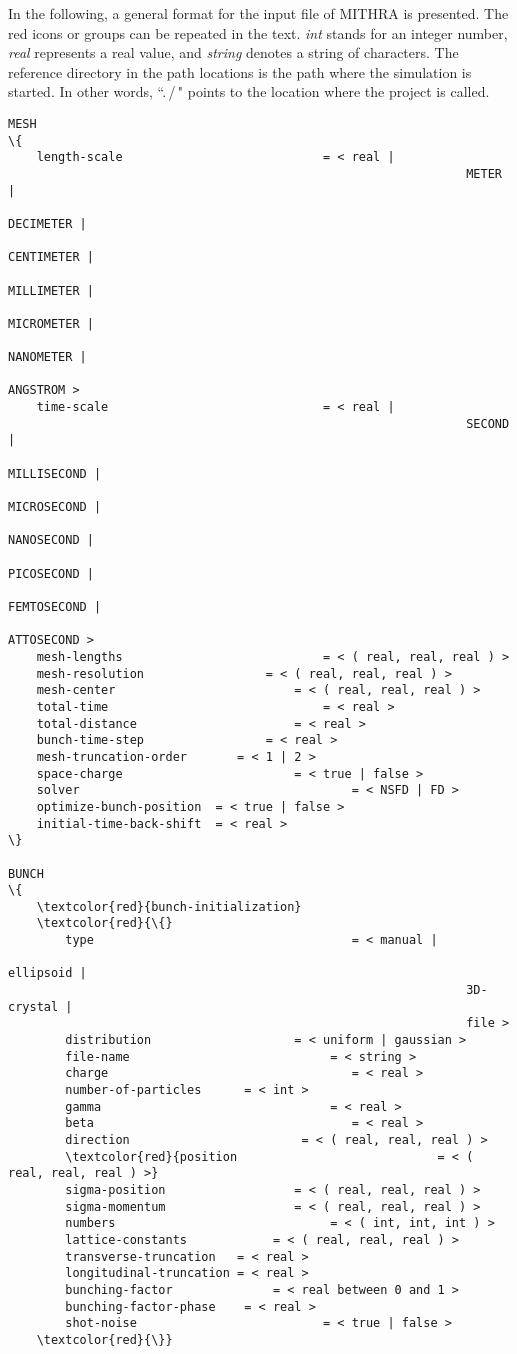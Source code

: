 \documentclass[9pt,a4paper]{article}
\begin{document}
\begin{landscape}
\begin{multicols}{3}
\setlength{\columnseprule}{0.1pt}
%
In the following, a general format for the input file of MITHRA is presented. The red icons or groups can be repeated in the text. \emph{int} stands for an integer number, \emph{real} represents a real value, and \emph{string} denotes a string of characters. The reference directory in the path locations is the path where the simulation is started. In other words, ``.\,/\," points to the location where the project is called.

\begin{Verbatim}[fontsize=\footnotesize, tabsize=2, fontfamily=courier,	fontseries=b, commandchars=\\\{\}]
MESH
\{
	length-scale							= < real | 
																METER | 
																DECIMETER | 
																CENTIMETER | 
																MILLIMETER | 
																MICROMETER |
																NANOMETER | 
																ANGSTROM >
	time-scale								= < real | 
																SECOND | 
																MILLISECOND | 
																MICROSECOND | 
																NANOSECOND | 
																PICOSECOND | 
																FEMTOSECOND | 
																ATTOSECOND >
	mesh-lengths							= < ( real, real, real ) >
	mesh-resolution		 			= < ( real, real, real ) >
	mesh-center				 			= < ( real, real, real ) >
	total-time								= < real >
	total-distance						= < real >
	bunch-time-step		 			= < real >
	mesh-truncation-order 		= < 1 | 2 >
	space-charge  						= < true | false >
	solver										= < NSFD | FD >
	optimize-bunch-position	 = < true | false >
	initial-time-back-shift	 = < real >
\}

BUNCH
\{
	\textcolor{red}{bunch-initialization}
	\textcolor{red}{\{}
		type  									= < manual | 
																ellipsoid | 
																3D-crystal | 
																file >
		distribution  					= < uniform | gaussian >
		file-name							 = < string >
		charge  								= < real >
		number-of-particles  	 = < int >
		gamma  								 = < real >
		beta  									= < real >
		direction  						 = < ( real, real, real ) >
		\textcolor{red}{position  							= < ( real, real, real ) >}
		sigma-position  				= < ( real, real, real ) >
		sigma-momentum  				= < ( real, real, real ) >
		numbers								 = < ( int, int, int ) >
		lattice-constants			 = < ( real, real, real ) >
		transverse-truncation   = < real >
		longitudinal-truncation = < real >
		bunching-factor  			 = < real between 0 and 1 >
		bunching-factor-phase	 = < real >
		shot-noise  						= < true | false >
	\textcolor{red}{\}}


\end{Verbatim}
\end{multicols}
\end{landscape}
\end{document}

